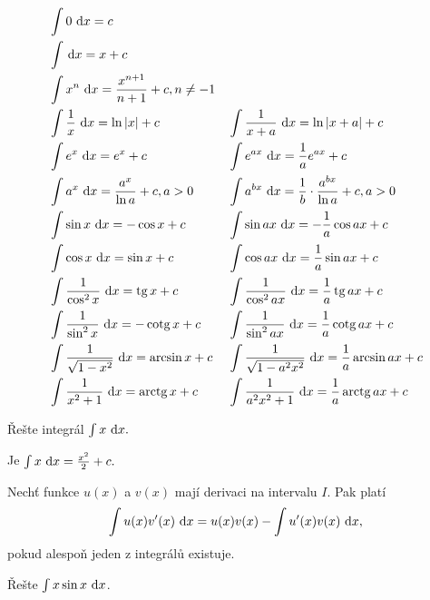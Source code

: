 \begin{pozn}
\begin{align*}
    &\int 0\, \d x = c & & \, \\
    &\int \, \d x = x+c & & \, \\
    &\int x^n \, \d x = \frac{x^{n+1}}{n+1}+c, n\ne -1 & & \, \\
    &\int \frac{1}{x} \, \d x = \ln |x| + c & & \int \frac{1}{x+a}\, \d x = \ln |x+a|+c \\
    &\int e^x\, \d x = e^x+c & & \int e^{ax}\, \d x = \frac{1}{a}e^{ax}+c \\
    &\int a^x \, \d x = \frac{a^x}{\ln a} + c, a >0 & & \int a^{bx} \, \d x = \frac{1}{b}\cdot \frac{a^{bx}}{\ln a}+c, a>0\\
    &\int \sin x \, \d x = -\cos x + c & & \int \sin ax \, \d x = -\frac{1}{a}\cos ax+c \\
    &\int \cos x \, \d x = \sin x +c & & \int \cos ax\, \d x = \frac{1}{a}\sin ax + c \\
    &\int \frac{1}{\cos^2 x}\, \d x = \tg x + c & & \int \frac{1}{\cos^2 ax}\, \d x=\frac{1}{a}\tg ax+c\\
    &\int \frac{1}{\sin^2 x} \, \d x = -\cotg x+c & & \int \frac{1}{\sin^2 ax}\, \d x = \frac{1}{a}\cotg ax+c \\
    &\int \frac{1}{\sqrt{1-x^2} }\, \d x = \arcsin x + c & & \int \frac{1}{\sqrt{1-a^2x^2} }\, \d x = \frac{1}{a}\arcsin ax+c \\
    &\int \frac{1}{x^2+1}\, \d x = \arctg x + c & & \int \frac{1}{a^2x^2 + 1}\, \d x = \frac{1}{a}\arctg ax + c
\end{align*}
\end{pozn}

\begin{priklad}
Řešte integrál $\int x \, \mathop{}\!\mathrm{d} x.$
\end{priklad}

\begin{reseni}
Je $\int x \, \mathop{}\!\mathrm{d} x=\frac{x^2}{2}+c.$
\end{reseni}

\begin{veta}
Nechť funkce $u(x) $ a $v(x)$ mají derivaci na intervalu $I$. Pak platí
$$\int u(x)v^\prime (x) \, \mathop{}\!\mathrm{d} x = u(x) v(x) - \int u^\prime (x) v(x) \, \mathop{}\!\mathrm{d} x,$$
pokud alespoň jeden z integrálů existuje.
\end{veta}

\begin{priklad}
Řešte $\int x \sin x \, \mathop{}\!\mathrm{d} x $.
\end{priklad}

